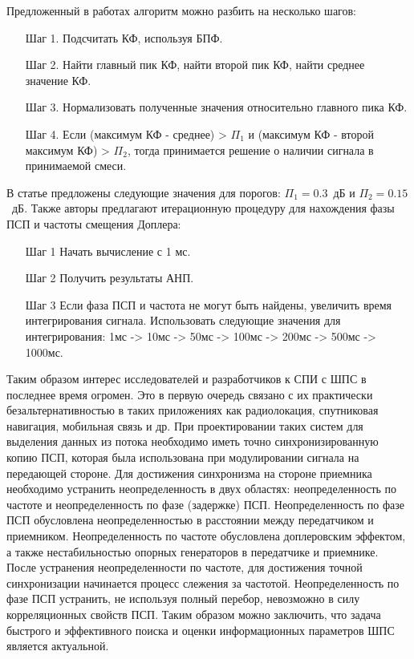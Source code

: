 Предложенный в работах алгоритм можно разбить на несколько шагов:
\begin{itemize}
	\item[Шаг 1.] Подсчитать КФ, используя БПФ.
	\item[Шаг 2.] Найти главный пик КФ, найти второй пик КФ, найти среднее значение КФ.
	\item[Шаг 3.] Нормализовать полученные значения относительно главного пика КФ.
	\item[Шаг 4.] Если (максимум КФ - среднее) > ${\Pi_1}$ и (максимум КФ - 
		второй максимум КФ) > ${\Pi_2}$, тогда принимается решение о наличии сигнала в принимаемой смеси. 
\end{itemize}

В статье \cite{2max_ieee} предложены следующие значения для порогов: \mbox{${\Pi_1} = 0.3$ дБ} и  \mbox{${\Pi_2} = 0.15$ дБ.}
Также авторы предлагают итерационную процедуру для нахождения фазы ПСП и частоты смещения Доплера:
\begin{itemize}
	\item[Шаг 1] Начать вычисление с 1 мс.
	\item[Шаг 2] Получить результаты АНП.
	\item[Шаг 3] Если фаза ПСП и частота не могут быть найдены, увеличить время интегрирования сигнала.
		Использовать следующие значения для интегрирования: 1мс -> 10мс -> 50мс -> 100мс -> 200мс -> 500мс -> 1000мс.
\end{itemize}

Таким образом интерес исследователей и разработчиков к СПИ с ШПС в последнее время огромен. Это в первую очередь связано с их
практически безальтернативностью  в таких приложениях как радиолокация, спутниковая навигация, мобильная связь и др. При проектировании таких систем
для выделения данных из потока необходимо иметь точно синхронизированную копию ПСП, которая была использована
при модулировании сигнала на передающей стороне. Для достижения синхронизма на стороне приемника необходимо
устранить неопределенность в двух областях: неопределенность по частоте и неопределенность по фазе (задержке) ПСП.
Неопределенность по фазе ПСП обусловлена неопределенностью в расстоянии между передатчиком и приемником. Неопределенность
по частоте обусловлена доплеровским эффектом, а также нестабильностью опорных генераторов в
передатчике и приемнике. После устранения неопределенности по частоте, для достижения точной синхронизации
начинается процесс слежения за частотой. Неопределенность по фазе ПСП устранить, не используя полный перебор,
невозможно в силу корреляционных свойств ПСП. Таким образом можно заключить, что задача быстрого и эффективного
поиска и оценки информационных параметров ШПС является актуальной.

